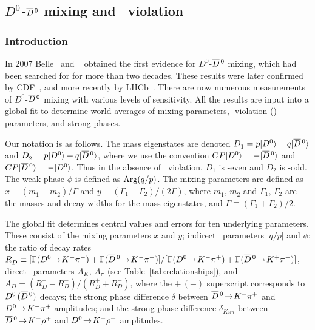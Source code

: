 \subsection{\emph{$D^0$-$\overline{D}{}^{\,0}$} mixing and \emph{\cp}\ violation}
\label{sec:charm:mixcpv}

\subsubsection{Introduction}

In 2007 Belle~\cite{Staric:2007dt} and \babar~\cite{Aubert:2007wf} 
obtained the first evidence for $D^0$-$\overline{D}{}^{\,0}$ mixing, which 
had been searched for for more than two decades. 
These results were later confirmed by CDF~\cite{Aaltonen:2007uc},
and more recently by LHCb~\cite{Aaij:2013wda}.
There are now numerous measurements of $D^0$-$\overline{D}{}^{\,0}$ mixing 
with various levels of sensitivity. All the results are
input into a global fit to determine
world averages of mixing parameters, \cp-violation (\cpv) 
parameters, and strong phases.

Our notation is as follows.
The mass eigenstates are denoted 
$D^{}_1 = p|D^0\rangle-q|\overline{D}{}^{\,0}\rangle$ and
$D^{}_2 = p|D^0\rangle+q|\overline{D}{}^{\,0}\rangle$, 
where we use the convention 
$CP|D^0\rangle=-|\overline{D}{}^{\,0}\rangle$ and 
$CP|\overline{D}{}^{\,0}\rangle=-|D^0\rangle$. Thus in the absence of 
\cp\ violation, $D^{}_1$ is \cp-even and $D^{}_2$ is \cp-odd.
The weak phase $\phi$ is defined as ${\rm Arg}(q/p)$.
The mixing parameters are defined as 
$x\equiv(m^{}_1-m^{}_2)/\Gamma$ and 
$y\equiv (\Gamma^{}_1-\Gamma^{}_2)/(2\Gamma)$, where 
$m^{}_1,\,m^{}_2$ and $\Gamma^{}_1,\,\Gamma^{}_2$ are
the masses and decay widths for the mass eigenstates,
and $\Gamma\equiv (\Gamma^{}_1+\Gamma^{}_2)/2$. 


The global fit determines central values and errors
for ten underlying parameters. These consist of the
mixing parameters $x$ and $y$; 
indirect \cpv\ parameters $|q/p|$ and $\phi$; 
the ratio of decay rates
$R^{}_D\equiv
[\Gamma(D^0\ra K^+\pi^-)+\Gamma(\dbar\ra K^-\pi^+)]/
[\Gamma(D^0\ra K^-\pi^+)+\Gamma(\dbar\ra K^+\pi^-)]$,
direct \cpv\ parameters $A^{}_K$, $A^{}_\pi$
(see Table~\ref{tab:relationships}), and
$A^{}_D =(R^+_D-R^-_D)/(R^+_D+R^-_D)$, where the $+\,(-)$
superscript corresponds to $D^0\,(\overline{D}{}^{\,0})$ decays;
the strong phase difference
$\delta$ between $\overline{D}{}^{\,0}\!\rightarrow\! K^-\pi^+$ and 
$D^0\!\rightarrow\! K^-\pi^+$ amplitudes; and 
the strong phase difference $\delta^{}_{K\pi\pi}$ between 
$\overline{D}{}^{\,0}\!\rightarrow\! K^-\rho^+$ and $D^0\!\rightarrow\! K^-\rho^+$ amplitudes. 

